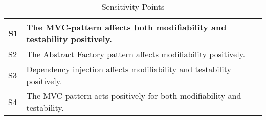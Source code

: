\begin{table}[h]
  \begin{tabularx}{360pt}{|l|X|}
		\hline
			S1 & The MVC-pattern affects both modifiability and testability positively.\\
			\hline
			S2 & The Abstract Factory pattern affects modifiability positively.\\
			\hline
			S3 & Dependency injection affects modifiability and testability positively.\\
			\hline
			S4 & The MVC-pattern acts positively for both modifiability and testability.\\
			\hline
		\end{tabularx}
		\caption{Sensitivity Points}
 	  \label{sensitivityPoints}
\end{table}

